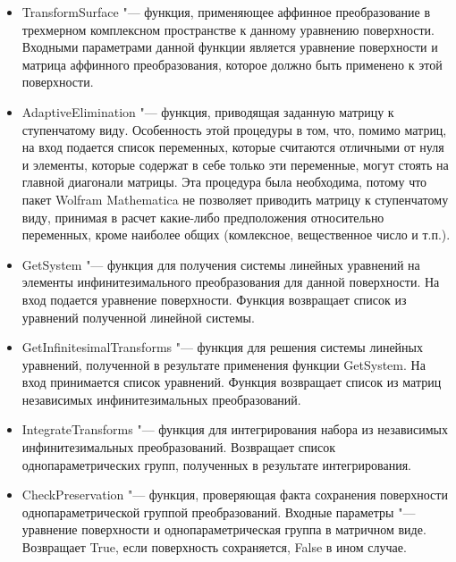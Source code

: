 \documentclass[../main.tex]{subfiles}
\begin{document}
\begin{itemize}

\item {\ttfamily TransformSurface} "--- функция, применяющее аффинное преобразование в трехмерном комплексном пространстве к данному уравнению поверхности. Входными параметрами данной функции является уравнение поверхности и матрица аффинного преобразования, которое должно быть применено к этой поверхности.

\item {\ttfamily AdaptiveElimination} "--- функция, приводящая заданную матрицу к ступенчатому виду. Особенность этой процедуры в том, что, помимо матриц, на вход подается список переменных, которые считаются отличными от нуля и элементы, которые содержат в себе только эти переменные, могут стоять на главной диагонали матрицы. Эта процедура была необходима, потому что пакет {\ttfamily Wolfram Mathematica} не позволяет приводить матрицу к ступенчатому виду, принимая в расчет какие-либо предположения относительно переменных, кроме наиболее общих (комлексное, вещественное число и т.п.).

\item {\ttfamily GetSystem} "---  функция для получения системы линейных уравнений на элементы инфинитезимального преобразования для данной поверхности. На вход подается уравнение поверхности. Функция возвращает список из уравнений полученной линейной системы.

\item {\ttfamily GetInfinitesimalTransforms} "--- функция для решения системы линейных уравнений, полученной в результате применения функции {\ttfamily GetSystem}. На вход принимается список уравнений. Функция возвращает список из матриц независимых инфинитезимальных преобразований.

\item {\ttfamily IntegrateTransforms} "--- функция для интегрирования набора из независимых инфинитезимальных преобразований. Возвращает список однопараметрических групп, полученных в результате интегрирования. 

\item {\ttfamily CheckPreservation} "--- функция, проверяющая факта сохранения поверхности однопараметрической группой преобразований. Входные параметры "--- уравнение поверхности и однопараметрическая группа в матричном виде. Возвращает {\ttfamily True}, если поверхность сохраняется, {\ttfamily False} в ином случае.

\end{itemize}
\end{document}
